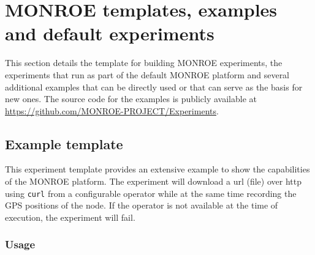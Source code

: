 \documentclass[a4paper,10pt]{article}
\newcommand{\monroe}{MONROE}
\newcommand{\identifier}[1]{{\texttt{\small{#1}}}}
\begin{document}

\section{\monroe{} templates, examples and default experiments}
\label{sec:examples}

This section details the template for building \monroe{} experiments, the experiments that run as part of the default \monroe{} platform and several additional examples that can be directly used or that can serve as the basis for new ones.
The source code for the examples is publicly available at \url{https://github.com/MONROE-PROJECT/Experiments}.


\subsection{Example template}
\label{subsec:exampleTemplate}

This experiment template provides an extensive example to show the capabilities of the \monroe{} platform.
The experiment will download a url (file) over http using \identifier{curl} from a configurable operator while at the same time recording the GPS positions of the node.
If the operator is not available at the time of execution, the experiment will fail.

\subsubsection{Usage}
\label{subsubsec:templateUsage}

\end{document}
